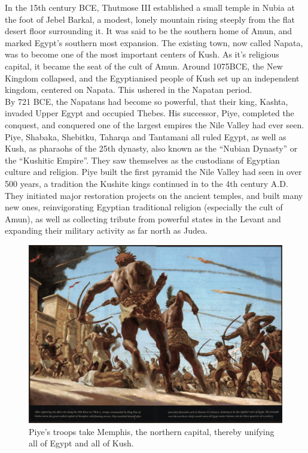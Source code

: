 \documentclass[a4paper,12pt]{scrreprt}
\begin{document}
In the 15th century BCE, Thutmose III established a small temple in Nubia at the foot of Jebel Barkal, a modest, lonely mountain rising steeply from the flat desert floor surrounding it. It was said to be the southern home of Amun, and marked Egypt’s southern most expansion. The existing town, now called Napata, was to become one of the most important centers of Kush. As it’s religious capital, it became the seat of the cult of Amun. Around 1075BCE, the New Kingdom collapsed, and the Egyptianised people of Kush set up an independent kingdom, centered on Napata. This ushered in the Napatan period.\\

By 721 BCE, the Napatans had become so powerful, that their king, Kashta, invaded Upper Egypt and occupied Thebes. His successor, Piye, completed the conquest, and conquered one of the largest empires the Nile Valley had ever seen. Piye, Shabaka, Shebitku, Taharqa and Tantamani all ruled Egypt, as well as Kush, as pharaohs of the 25th dynasty, also known as the “Nubian Dynasty” or the “Kushitic Empire”. They saw themselves as the custodians of Egyptian culture and religion. Piye built the first pyramid the Nile Valley had seen in over 500 years, a tradition the Kushite kings continued in to the 4th century A.D. They initiated major restoration projects on the ancient temples, and built many new ones, reinvigorating Egyptian traditional religion (especially the cult of Amun), as well as collecting tribute from powerful states in the Levant and expanding their military activity as far north as Judea.   

\begin{figure}[H]
	\centering
	\includegraphics[width=\textwidth]{img/piye_troops_take_memphis}
	\caption{Piye's troops take Memphis, the northern capital, thereby unifying all of Egypt and all of Kush.}
\end{figure}
\end{document}
